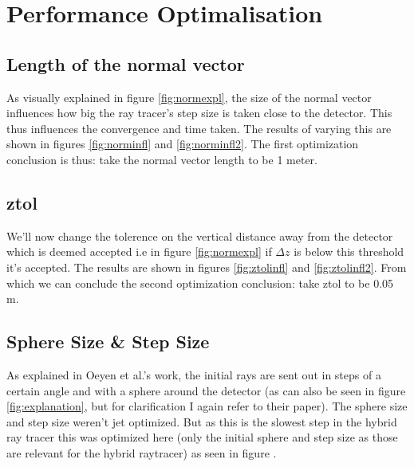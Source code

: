 \documentclass[twoside,twocolumn,11pt]{article} %
\begin{document}
\section{Performance Optimalisation}
\subsection{Length of the normal vector}
As visually explained in figure \ref{fig:normexpl}, the size of the normal vector
influences how big the ray tracer's step size is taken close to the detector. This
thus influences the convergence and time taken. The results of varying this are shown
in figures \ref{fig:norminfl} and \ref{fig:norminfl2}.
The first optimization conclusion is thus: take the normal vector length to be 1 meter.
\subsection{ztol}
We'll now change the tolerence on the vertical distance away from the detector which is deemed
accepted i.e in figure \ref{fig:normexpl} if $\Delta z$ is below this threshold it's accepted.
The results are shown in figures \ref{fig:ztolinfl} and \ref{fig:ztolinfl2}.
From which we can conclude the second optimization conclusion: take ztol to be 0.05 m.
\subsection{Sphere Size \& Step Size}
As explained in Oeyen et al.'s work, the initial rays are sent out in steps of a
certain angle and with a sphere around the detector (as can also be seen in
figure \ref{fig:explanation}, but for clarification I again refer to their
paper). The sphere size and step size weren't jet optimized. But as
this is the slowest step in the hybrid ray tracer this was optimized here (only
the initial sphere and step size as those are relevant for the hybrid
raytracer) as seen in figure .
\end{document}
